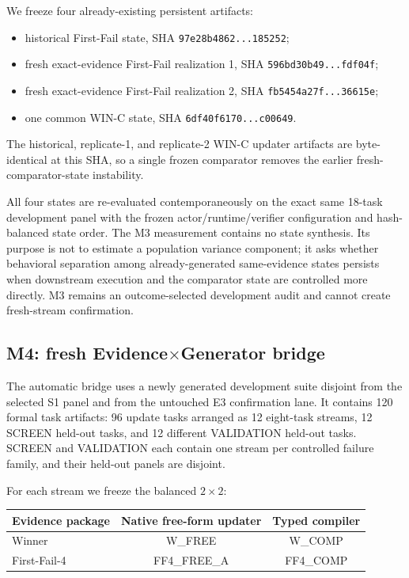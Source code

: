 We freeze four already-existing persistent artifacts:
\begin{itemize}
    \item historical First-Fail state, SHA \texttt{97e28b4862...185252};
    \item fresh exact-evidence First-Fail realization 1, SHA \texttt{596bd30b49...fdf04f};
    \item fresh exact-evidence First-Fail realization 2, SHA \texttt{fb5454a27f...36615e};
    \item one common WIN-C state, SHA \texttt{6df40f6170...c00649}.
\end{itemize}
The historical, replicate-1, and replicate-2 WIN-C updater artifacts are byte-identical at this SHA, so a single frozen comparator removes the earlier fresh-comparator-state instability.

All four states are re-evaluated contemporaneously on the exact same 18-task development panel with the frozen actor/runtime/verifier configuration and hash-balanced state order. The M3 measurement contains no state synthesis. Its purpose is not to estimate a population variance component; it asks whether behavioral separation among already-generated same-evidence states persists when downstream execution and the comparator state are controlled more directly. M3 remains an outcome-selected development audit and cannot create fresh-stream confirmation.

\subsection{M4: fresh Evidence$\times$Generator bridge}
The automatic bridge uses a newly generated development suite disjoint from the selected S1 panel and from the untouched E3 confirmation lane. It contains 120 formal task artifacts: 96 update tasks arranged as 12 eight-task streams, 12 SCREEN held-out tasks, and 12 different VALIDATION held-out tasks. SCREEN and VALIDATION each contain one stream per controlled failure family, and their held-out panels are disjoint.

For each stream we freeze the balanced $2\times2$:
\begin{center}
\begin{tabular}{lcc}
\toprule
Evidence package & Native free-form updater & Typed compiler \\
\midrule
Winner & W\_FREE & W\_COMP \\
First-Fail-4 & FF4\_FREE\_A & FF4\_COMP \\
\bottomrule
\end{tabular}
\end{center}

